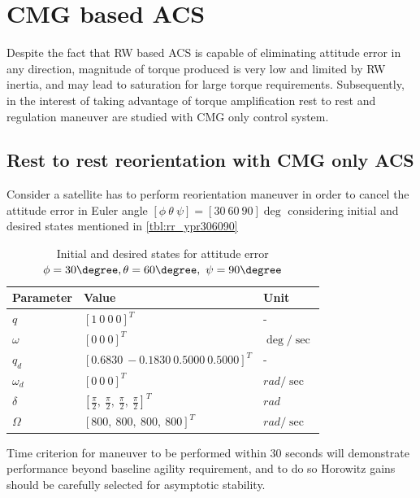 \section{CMG based ACS}
Despite the fact that RW based ACS is capable of eliminating attitude error in any direction, magnitude of torque produced is very low and limited by RW inertia, and may lead to saturation for large torque requirements. Subsequently, in the interest of taking advantage of torque amplification rest to rest and regulation maneuver are studied with CMG only control system.  
\subsection{Rest to rest reorientation with CMG only ACS}
Consider a satellite has to perform reorientation maneuver in order to cancel the attitude error in Euler angle $[\phi \ \theta \ \psi] = [30 \ 60 \ 90] \deg$ considering initial and desired states mentioned in \autoref{tbl:rr_ypr306090}


\begin{table}[!h]
        \centering
        
\begin{tabular}{p{}|p{}|p{}}
\toprule
 Parameter & Value & Unit \\
\midrule
 $\displaystyle q$ & $\displaystyle [ 1\ 0\ 0\ 0]^{T}$ & - \\
\hline 
 $\displaystyle \omega $ & $\displaystyle [ 0\ 0\ 0]^{T}$ & $\displaystyle \deg /\sec$ \\
\hline 
 $\displaystyle q_{d}$ & $\displaystyle [ 0.6830\ -0.1830\ 0.5000\ 0.5000]^{T}$ & - \\
\hline 
 $\displaystyle \omega _{d}$ & $\displaystyle [ 0\ 0\ 0]^{T}$ & $\displaystyle rad/\sec$ \\
\hline 
 $\displaystyle \delta $ & $\displaystyle \left[\frac{\pi }{2} ,\ \frac{\pi }{2} ,\ \frac{\pi }{2} ,\ \frac{\pi }{2}\right]^{T}$ & $\displaystyle rad$ \\
\hline 
 $\displaystyle \Omega $ & $\displaystyle [ 800,\ 800,\ 800,\ 800]^{T}$ & $\displaystyle rad/\sec$ \\
 \bottomrule
\end{tabular}
        \caption{Initial and desired states for attitude error $\displaystyle \phi =30\degree ,\theta =60\degree ,\ \psi =90\degree $}
\label{tbl:rr_ypr306090}
\end{table}
\noindent Time criterion for maneuver to be performed within 30 seconds will demonstrate performance beyond baseline agility requirement, and to do so Horowitz gains should be carefully selected for asymptotic stability. 


